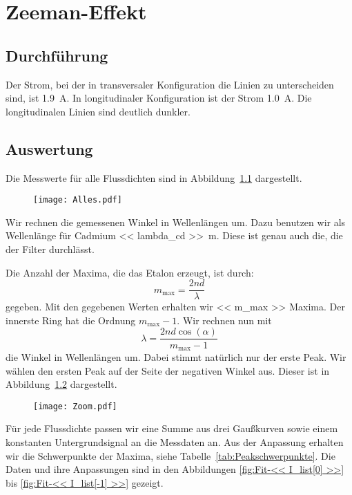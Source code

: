 \chapter{Zeeman-Effekt}

\section{Durchführung}

Der Strom, bei der in transversaler Konfiguration die Linien zu unterscheiden
sind, ist \SI{1.9}{\ampere}. In longitudinaler Konfiguration ist der Strom
\SI{1.0}{\ampere}. Die longitudinalen Linien sind deutlich dunkler.

\section{Auswertung}

Die Messwerte für alle Flussdichten sind in Abbildung~\ref{fig:Alles}
dargestellt.

\begin{figure}[htbp]
    \centering
    \texttt{[image: Alles.pdf]}
    \caption{%
    }
    \label{fig:Alles}
\end{figure}

Wir rechnen die gemessenen Winkel in Wellenlängen um. Dazu benutzen wir als
Wellenlänge für Cadmium \SI{<< lambda_cd >>}{\meter}. Diese ist genau auch die,
die der Filter durchlässt.

Die Anzahl der Maxima, die das Etalon erzeugt, ist durch:
\[
    m_\text{max} = \frac{2nd}{\lambda}
\]
gegeben. Mit den gegebenen Werten erhalten wir \num{<< m_max >>} Maxima. Der
innerste Ring hat die Ordnung $m_\text{max} - 1$. Wir rechnen nun mit
\[
    \lambda = \frac{2 n d \cos(\alpha)}{m_\text{max} - 1}
\]
die Winkel in Wellenlängen um. Dabei stimmt natürlich nur der erste Peak. Wir
wählen den ersten Peak auf der Seite der negativen Winkel aus. Dieser ist in
Abbildung~\ref{fig:Zoom} dargestellt.

\begin{figure}[htbp]
    \centering
    \texttt{[image: Zoom.pdf]}
    \caption{%
    }
    \label{fig:Zoom}
\end{figure}

Für jede Flussdichte passen wir eine Summe aus drei Gaußkurven sowie einem
konstanten Untergrundsignal an die Messdaten an. Aus der Anpassung erhalten wir
die Schwerpunkte der Maxima, siehe Tabelle~\ref{tab:Peakschwerpunkte}. Die
Daten und ihre Anpassungen sind in den Abbildungen \ref{fig:Fit-<< I_list[0]
>>} bis \ref{fig:Fit-<< I_list[-1] >>} gezeigt.

